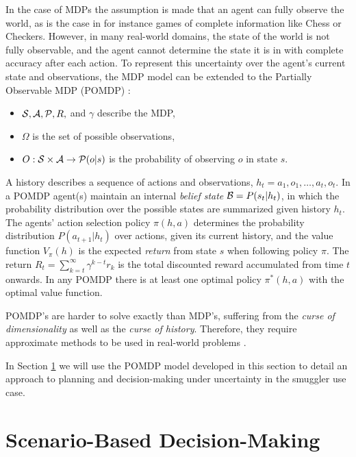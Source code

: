 \documentclass[conference]{IEEEtran}
\begin{document}
In the case of MDPs the assumption is made that an agent can fully observe the world, as is the case in for instance games of complete information like Chess or Checkers. However, in many real-world domains, the state of the world is not fully observable, and the agent cannot determine the state it is in with complete accuracy after each action. To represent this uncertainty over the agent's current state and observations, the MDP model can be extended to the Partially Observable MDP (POMDP) \cite{aastrom1965optimal,pomdp}: 

\begin{itemize}
\item $\S,\mathcal{A},\P,R,$ and $\gamma$ describe the MDP,
\item $\Omega$ is the set of possible observations,
\item $O:\S\times\mathcal{A}\to\P(o|s)$ is the probability of observing $o$ in state $s$. 
\end{itemize}

A history describes a sequence of actions and observations, $h_t = {a_1, o_1, \ldots, a_t, o_t}$. In a POMDP agent(s) maintain an internal {\it belief state} $\B = P(s_t | h_t)$, in which the probability distribution over the possible states are summarized given history $h_t$. The agents' action selection policy $\pi(h,a)$ determines the probability distribution $P(a_{t+1}|h_t)$ over actions, given its current history, and the value function $V_{\pi}(h)$ is the expected {\it return} from state $s$ when following policy $\pi$. The return $R_t = \sum\nolimits_{k=t}^{\infty} \gamma^{k−t}r_k$ is the total discounted reward accumulated from time $t$ onwards. In any POMDP there is at least one optimal policy $π^*(h, a)$ with the optimal value function.

POMDP's are harder to solve exactly than MDP's, suffering from the {\it curse of dimensionality} as well as the {\it curse of history}. Therefore, they require approximate methods to be used in real-world problems \cite{pineau2006anytime}.

In Section \ref{sec:scenario-based-dm} we will use the POMDP model developed in this section to detail an approach to planning and decision-making under uncertainty in the smuggler use case.


\section{Scenario-Based Decision-Making}
\label{sec:scenario-based-dm}
\end{document}
